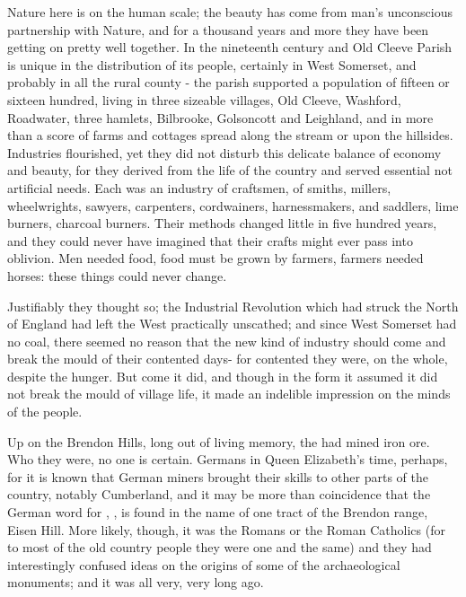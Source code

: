 Nature here is on the human scale; the beauty has come from man's unconscious partnership with Nature, and for a thousand years and more they have been getting on pretty well together. In the nineteenth century and Old Cleeve Parish is unique in the distribution of its people, certainly in West Somerset, and probably in all the rural county -  the parish supported a population of fifteen or sixteen hundred, living in three sizeable villages, Old Cleeve, Washford, Roadwater, three hamlets, Bilbrooke, Golsoncott and Leighland, and in more than a score of farms and cottages spread along the stream or upon the hillsides. Industries flourished, yet they did not disturb this delicate balance of economy and beauty, for they derived from the life of the country and served essential not artificial needs. Each was an industry of craftsmen, of smiths, millers, wheelwrights, sawyers, carpenters, cordwainers, harnessmakers, and saddlers, lime burners, charcoal burners. Their methods changed little in five hundred years, and they could never have imagined that their crafts might ever pass into oblivion. Men needed food, food must be grown by farmers, farmers needed horses: these things could never change.

Justifiably they thought so; the Industrial Revolution which had struck the North of England had left the West practically unscathed; and since West Somerset had no coal, there seemed no reason that the new kind of industry should come and break the mould of their contented days- for contented they were, on the whole, despite the hunger. But come it did, and though in the form it assumed it did not break the mould of village life, it made an indelible impression on the minds of the people. 

Up on the Brendon Hills, long out of living memory, the  had mined iron ore. Who they were, no one is certain. Germans in Queen Elizabeth’s time, perhaps, for it is known that German miners brought their skills to other parts of the country, notably Cumberland, and it may be more than coincidence that the German word for , , is found in the name of one tract of the Brendon range, Eisen Hill. More likely, though, it was the Romans or the Roman Catholics (for to most of the old country people they were one and the same) and they had interestingly confused ideas on the origins of some of the archaeological monuments; and it was all very, very long ago.

